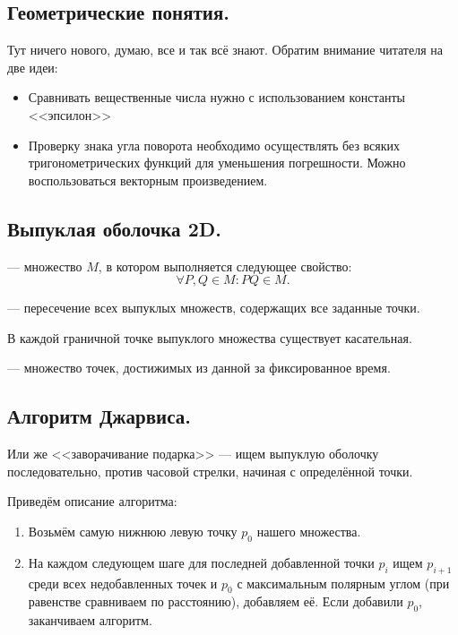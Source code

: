 \subsection{Геометрические понятия.}
Тут ничего нового, думаю, все и так всё знают. Обратим внимание читателя на две идеи:
\begin{itemize}
  \item Сравнивать вещественные числа нужно с использованием константы <<эпсилон>>
  \item Проверку знака угла поворота необходимо осуществлять без всяких тригонометрических функций для
    уменьшения погрешности. Можно воспользоваться векторным произведением.
\end{itemize}
\subsection{Выпуклая оболочка 2D.}
\begin{definition}
   --- множество $M$, в котором выполняется следующее свойство: 
  \[
  \forall P, Q \in M \colon PQ \in M
  .\] 
\end{definition}
\begin{definition}
   --- пересечение всех выпуклых множеств, содержащих все заданные
  точки.
\end{definition}

\begin{remark}
  В каждой граничной точке выпуклого множества существует касательная.
\end{remark}

\begin{definition}
   --- множество точек, достижимых из данной за фиксированное время.
\end{definition}

\subsection{Алгоритм Джарвиса.}
Или же <<заворачивание подарка>> --- ищем выпуклую оболочку последовательно, против часовой стрелки,
начиная с определённой точки.

Приведём описание алгоритма:
\begin{enumerate}
  \item Возьмём самую нижнюю левую точку $p_0$ нашего множества.
  \item На каждом следующем шаге для последней добавленной точки $p_{i}$ ищем $p_{i+1}$ среди всех
    недобавленных точек и $p_0$ с максимальным полярным углом (при равенстве сравниваем по расстоянию),
    добавляем её. Если добавили $p_0$, заканчиваем алгоритм.
\end{enumerate}

